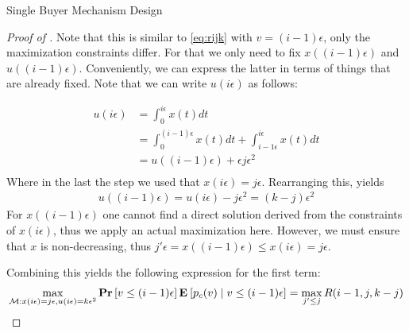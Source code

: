 \documentclass[11pt,a4paper]{article}
\renewcommand{\Pr}[1]{\mbox{\rm\bf Pr}\left[#1\right]}
\newcommand{\Ex}[2][]{\mbox{\rm\bf E}_{#1}\left[#2\right]}
\newcommand{\1}[1]{\mbox{\rm\bf 1}_{#1}}
\begin{document}
\begin{section}{Single Buyer Mechanism Design}
\begin{proof}[Proof of ]
     Note that this is similar to \cref{eq:rijk} with $v = (i-1) \epsilon$, only the maximization constraints differ.
     For that we only need to fix $x((i-1)\epsilon)$ and $u((i-1)\epsilon)$.
     Conveniently, we can express the latter in terms of things that are already fixed.
     Note that we can write $u(i\epsilon)$ as follows:

     \begin{align*}
         u(i\epsilon) & = \int_0^{i\epsilon} x(t) dt                                             \\
                      & = \int_0^{(i-1)\epsilon} x(t) dt + \int_{i-1\epsilon}^{i\epsilon} x(t)dt \\
                      & = u((i-1)\epsilon) + \epsilon j \epsilon^2                               \\
     \end{align*}
     Where in the last the step we used that $x(i\epsilon) = j\epsilon$.
     Rearranging this, yields
     \begin{align*}
         u((i-1)\epsilon) = u(i\epsilon) - j \epsilon^2 = (k - j) \epsilon^2
     \end{align*}
     For $x((i - 1)\epsilon)$ one cannot find a direct solution derived from the constraints of $x(i\epsilon)$, thus we apply an actual maximization here.
     However, we must ensure that $x$ is non-decreasing, thus $j' \epsilon = x((i-1)\epsilon) \leq x(i\epsilon) = j\epsilon$.

     Combining this yields the following expression for the first term:
     \begin{align*}
         \max_{\mathcal{M}: x(i\epsilon) = j\epsilon, u(i\epsilon) = k \epsilon^2} \Pr{v \leq (i-1)\epsilon} \Ex{p_c(v) \mid v \leq (i - 1) \epsilon} = \max_{j' \leq j} R(i-1, j, k - j)
     \end{align*}


\end{proof}
\end{section}
\end{document}

